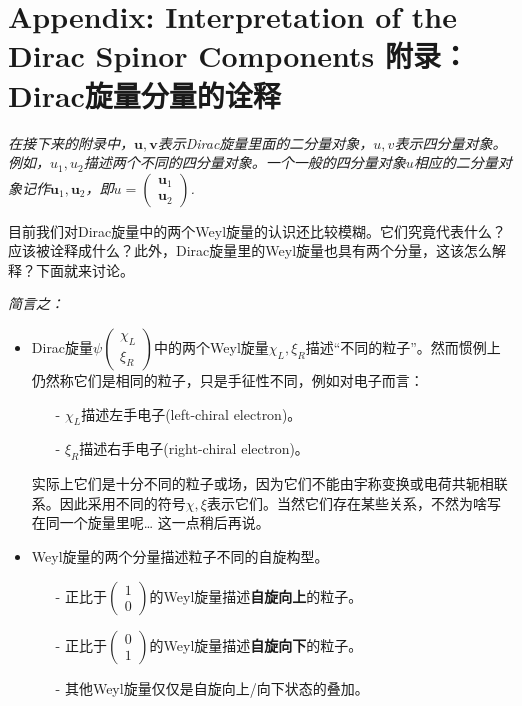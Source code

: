 \section[附录：Dirac旋量分量的诠释]{Appendix: Interpretation of the Dirac Spinor Components \quad 附录：Dirac旋量分量的诠释}\label{sec8.8}
{\it 在接下来的附录中，$\mathbf{u}, \mathbf{v}$表示Dirac旋量里面的二分量对象，$u, v$表示四分量对象。例如，$u_1, u_2$描述两个不同的四分量对象。一个一般的四分量对象$u$相应的二分量对象记作$\mathbf{u}_1, \mathbf{u}_2$，即$u = \begin{pmatrix} \mathbf{u}_1 \\ \mathbf{u}_2 \end{pmatrix}$.
}

目前我们对Dirac旋量中的两个Weyl旋量的认识还比较模糊。它们究竟代表什么？应该被诠释成什么？此外，Dirac旋量里的Weyl旋量也具有两个分量，这该怎么解释？下面就来讨论。

{\it 简言之：}

\begin{itemize}
\item Dirac旋量$\psi \begin{pmatrix} \chi_L \\ \xi_R \end{pmatrix}$中的两个Weyl旋量$\chi_L, \xi_R$描述“不同的粒子”。然而惯例上仍然称它们是相同的粒子，只是手征性不同，例如对电子而言：
\begin{itemize}
\item[-] $\chi_L$描述左手电子(left-chiral electron)。
\item[-] $\xi_R$描述右手电子(right-chiral electron)。
\end{itemize}
实际上它们是十分不同的粒子或场，因为它们不能由宇称变换或电荷共轭相联系。因此采用不同的符号$\chi, \xi$表示它们。当然它们存在某些关系，不然为啥写在同一个旋量里呢… 这一点稍后再说。

\item Weyl旋量的两个分量描述粒子不同的自旋构型。
\begin{itemize}
\item[-] 正比于$\begin{pmatrix} 1 \\ 0 \end{pmatrix}$的Weyl旋量描述{\bf 自旋向上}的粒子。
\item[-] 正比于$\begin{pmatrix} 0 \\ 1 \end{pmatrix}$的Weyl旋量描述{\bf 自旋向下}的粒子。
\item[-] 其他Weyl旋量仅仅是自旋向上/向下状态的叠加。
\end{itemize}
\end{itemize}

